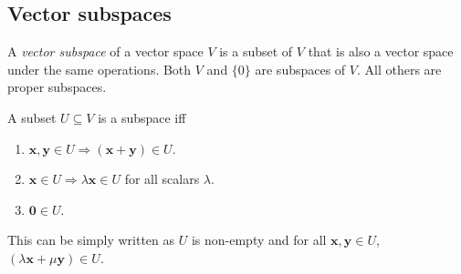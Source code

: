 \documentclass[a4paper]{article}
\begin{document}
\subsection{Vector subspaces}
\begin{defi}
  A \emph{vector subspace} of a vector space $V$ is a subset of $V$ that is also a vector space under the same operations. Both $V$ and $\{0\}$ are subspaces of $V$. All others are proper subspaces.

  A subset $U\subseteq V$ is a subspace iff
  \begin{enumerate}
    \item $\mathbf{x, y}\in U \Rightarrow (\mathbf{x + y}) \in U$.
    \item $\mathbf{x}\in U \Rightarrow \lambda\mathbf{x} \in U$ for all scalars $\lambda$.
    \item $\mathbf{0}\in U$.
  \end{enumerate}
  This can be simply written as $U$ is non-empty and  for all $\mathbf{x, y}\in U$, $(\lambda\mathbf{x} + \mu\mathbf{y})\in U$.
\end{defi}
\end{document}
